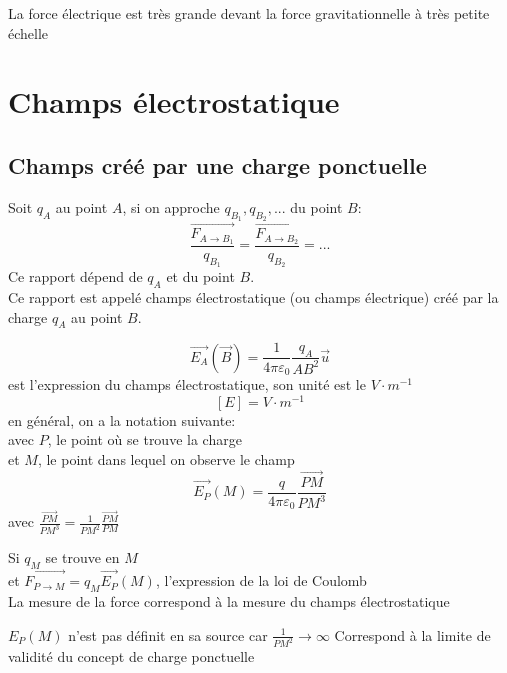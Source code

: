 \documentclass[../main.tex]{subfile}
\begin{document}
La force électrique est très grande devant la force gravitationnelle à très petite échelle

\section{Champs électrostatique}
\subsection{Champs créé par une charge ponctuelle}
Soit $q_A$ au point $A$, si on approche $q_{B_1}, q_{B_2}, ...$ du point $B$:
$$\frac{\vec{F_{A \to B_1}}}{q_{B_1}} = \frac{\vec{F_{A \to B_2}}}{q_{B_2}} = ...$$
Ce rapport dépend de $q_A$ et du point $B$.\\
Ce rapport est appelé champs électrostatique (ou champs électrique) créé par la charge $q_A$ au point $B$.

$$\vec{E_A}(\vec{B}) = \frac{1}{4 \pi \varepsilon_0} \frac{q_A}{AB^2} \vec{u}$$
est l'expression du champs électrostatique, son unité est le $V \cdot m^{-1}$
$$[E] = V \cdot m^{-1}$$
en général, on a la notation suivante:\\
avec $P$, le point où se trouve la charge\\
et $M$, le point dans lequel on observe le champ
$$\vec{E_P}(M) = \frac{q}{4\pi \varepsilon_0} \frac{\vec{PM}}{PM^3}$$
avec $\frac{\vec{PM}}{PM^3} = \frac{1}{PM^2} \frac{\vec{PM}}{PM}$\\

\begin{rema}
	Si $q_M$ se trouve en $M$\\
	et $\vec{F_{P \to M}} = q_M \vec{E_P}(M)$, l'expression de la loi de Coulomb\\
	La mesure de la force correspond à la mesure du champs électrostatique
\end{rema}

\begin{rema}
	$E_P(M)$ n'est pas définit en sa source car $\frac{1}{PM^2} \to \infty$
	Correspond à la limite de validité du concept de charge ponctuelle
\end{rema}
\end{document}
